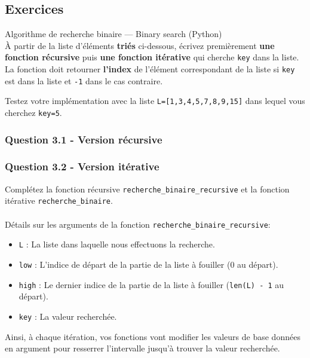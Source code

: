     \subsection{Exercices}

    
    \begin{Exercice}[20 minutes] Algorithme de recherche binaire — Binary search (Python)\\
    
    À partir de la liste d'éléments \textbf{triés} ci-dessous, écrivez premièrement \textbf{une fonction récursive} puis \textbf{une fonction itérative} qui cherche \texttt{key} dans la liste. La fonction doit retourner \textbf{l'index} de l'élément correspondant de la liste si \texttt{key} est dans la liste et \lstinline{-1} dans le cas contraire.\\
    
    \begin{conseil}
        Testez votre implémentation avec la liste \texttt{L=[1,3,4,5,7,8,9,15]} dans lequel vous cherchez \texttt{key=5}.
    \end{conseil}
    
    \subsubsection*{Question 3.1 - Version récursive}
    
    
    \subsubsection*{Question 3.2 - Version itérative}
    
    
    
        \begin{conseil}
            Complétez la fonction récursive \lstinline{recherche_binaire_recursive} et la fonction itérative \lstinline{recherche_binaire}.\\\\
            Détails sur les arguments de la fonction \lstinline{recherche_binaire_recursive}:
            \begin{itemize}
            \item \lstinline{L} : La liste dans laquelle nous effectuons la recherche.
            \item \lstinline{low} : L'indice de départ de la partie de la liste à fouiller (0 au départ).
            \item \lstinline{high} : Le dernier indice de la partie de la liste à fouiller (\lstinline{len(L) - 1} au départ).
            \item \lstinline{key} : La valeur recherchée.
            \end{itemize}
            Ainsi, à chaque itération, vos fonctions vont modifier les valeurs de base données en argument pour resserrer l'intervalle jusqu'à trouver la valeur recherchée.\\        
            

\end{conseil}
\end{Exercice}
